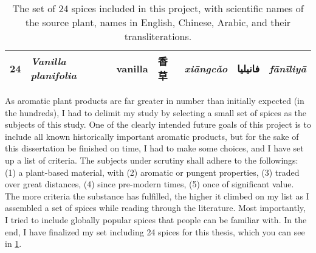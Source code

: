 \begin{table}[ht]
\begin{tabularx}{\textwidth}{@{}r>{\footnotesize}llll@{}rl@{}}
24          & \textit{Vanilla planifolia}        & vanilla          & 香草               & \textit{xiāngcǎo}        & فانيليا         & \textit{fānīliyā}\\ 
\bottomrule
\end{tabularx}
\caption[The set of 24 spices included in this project.]{The set of 24 spices included in this project, with scientific names of the source plant, names in English, Chinese, Arabic, and their transliterations.}
\label{table:set}
\end{table}

\setlength{\tabcolsep}{6pt}


As aromatic plant products are far greater in number than initially expected (in the hundreds), I had to delimit my study by selecting a small set of spices as the subjects of this study. One of the clearly intended future goals of this project is to include all known historically important aromatic products, but for the sake of this dissertation be finished on time, I had to make some choices, and I have set up a list of criteria. The subjects under scrutiny shall adhere to the followings: (1) a plant-based material, with (2) aromatic or pungent properties, (3) traded over great distances, (4) since pre-modern times, (5) once of significant value. The more criteria the substance has fulfilled, the higher it climbed on my list as I assembled a set of spices while reading through the literature. Most importantly, I tried to include globally popular spices that people can be familiar with. In the end, I have finalized my set including 24 spices for this thesis, which you can see in \cref{table:set}. 


